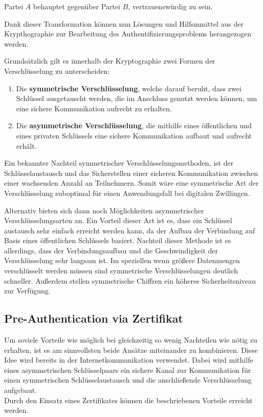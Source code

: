 \begin{problem}[Authentifizierung]
    Partei $A$ behauptet gegenüber Partei $B$, vertrauenswürdig zu sein.
\end{problem}

Dank dieser Transformation können nun Lösungen und Hilfsmmittel aus der Krypthographie zur Bearbeitung des Authentifizierungsproblems herangezogen werden.

Grundsätzlich gilt es innerhalb der Kryptographie zwei Formen der Verschlüsselung zu unterscheiden:

\begin{enumerate}
    \item Die \textbf{symmetrische Verschlüsselung}, welche darauf beruht, dass zwei Schlüssel ausgetauscht werden, die im Anschluss genutzt werden können, um eine sichere Kommunikation aufrecht zu erhalten.
    \item  Die \textbf{asymmetrische Verschlüsselung}, die mithilfe eines öffentlichen und eines privaten Schlüssels eine sichere Kommunikation aufbaut und aufrecht erhält.
\end{enumerate}

Ein bekannter Nachteil symmetrischer Verschlüsselungsmethoden, ist der Schlüsselaustausch und das Sicherstellen einer sicheren Kommunikation zwischen einer wachsenden Anzahl an Teilnehmern. Somit wäre eine symmetrische Art der Verschlüsselung suboptimal für einen Anwendungsfall bei digitalen Zwillingen.

Alternativ bieten sich dann noch Möglichkeiten asymmetrischer Verschlüsselungsarten an. Ein Vorteil dieser Art ist es, dass ein Schlüssel austausch sehr einfach erreicht werden kann, da der Aufbau der Verbindung auf Basis eines öffentlichen Schlüssels basiert. Nachteil dieser Methode ist es allerdings, dass der Verbindungsaufbau und die Geschwindigkeit der Verschlüsselung sehr langsam ist. Im speziellen wenn größere Datenmengen verschlüsselt werden müssen sind symmetrische Verschlüsselungen deutlich schneller. Außerdem stellen symmetrische Chiffren ein höheres Sicherheitsniveau zur Verfügung.

\subsection{Pre-Authentication via Zertifikat}
\label{sec:certificate}

Um soviele Vorteile wie möglich bei gleichzeitig so wenig Nachteilen wie nötig zu erhalten, ist es am sinnvollsten beide Ansätze miteinander zu kombinieren. Diese Idee wird bereits in der Internetkommunikation verwendet. Dabei wird mithilfe eines asymmetrischen Schlüsselpaars ein sichere Kanal zur Kommunikation für einen symmetrischen Schlüsselaustausch und die anschließende Verschlüsselung aufgebaut. \\
Durch den Einsatz eines Zertifikates können die beschriebenen Vorteile erreicht werden.

